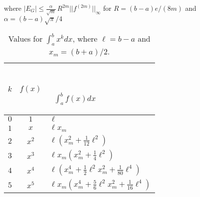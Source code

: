 \documentclass[12pt]{article}
\begin{document}
\medskip
where $|E_G | \le \frac{\alpha}{\sqrt{m}} \, R^{2 m }  ||f^{(2 m)}||_\infty$ for $R=(b-a)e/(8m)$ and $\alpha=(b-a)\sqrt{\pi}/4$\\

$ $

\begin{table}[h]
\begin{center}
\renewcommand\arraystretch{2.2}
\renewcommand\tabcolsep{6pt}
\begin{tabular}{c|c|l}
$\displaystyle k$ & $\displaystyle f(x)$ &  \, \rule[-10pt]{0pt}{5pt}\hbox{  $ \displaystyle \int_a^b f(x)dx$ }  \\ \hline
  $\displaystyle 0$ &  $\displaystyle 1$ &    $\ell$  \\
  $\displaystyle 1$ & $\displaystyle x$ &    $\displaystyle \ell x_m$  \\
  $\displaystyle 2$ &$\displaystyle x^2$ &    $\displaystyle \ell \! \left ( x_m^2 + \frac{1}{12} \ell^2   \right )$  \\
  $\displaystyle 3$ &$\displaystyle x^3$ &    $\displaystyle \ell x_m \! \left (  x_m^2 +\frac{1}{4}  \ell^2  \right ) $  \\
  $\displaystyle 4$ &$\displaystyle x^4$ &    $\displaystyle \ell \! \left ( x_m^4 + \frac{1}{2}\ell^2x_m^2 +  \frac{1}{80}\ell^4  \right  )$  \\
  $\displaystyle 5$ &  $\displaystyle x^5$ &    $\displaystyle \ell x_m \! \left ( x_m^4 + \frac{5}{6} \ell^2x_m^2 +  \frac{1}{16}\ell^4  \right  )$  
\end{tabular}
\end{center}
\caption{Values for $\int_a^bx^kdx$, where $\ell=b-a$ and $x_m=(b+a)/2$.}
\end{table}





 
\end{document}
